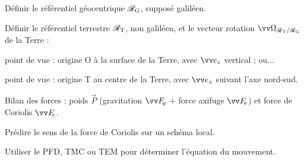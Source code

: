 \documentclass[12pt,fancy]{cours}
\begin{document}
\begin{methode}
  \item	Définir le référentiel géocentrique $\mathcal{R}_{\rm{G}}$, supposé galiléen.
  \item	Définir le référentiel terrestre $\mathcal{R}_{\rm T}$, non galiléen, et le vecteur rotation $\Vec{\Omega}_{\rm \RT/\RG}$ de la Terre :
  \begin{liste}
    \item point de vue  : origine O à la surface de la Terre, avec  $\ez$ vertical ; ou...
    \item point de vue  : origine T au centre de la Terre, avec $\ez$ suivant l'axe nord-sud.
  \end{liste}
  \item Bilan des forces : poids $\Vec{P}$ (gravitation $\F_{\!g}$ $+$ force axifuge $\Fe$) et force de Coriolis $\Fc$.
  \item Prédire le sens de la force de Coriolis sur un schéma local.
  \item Utiliser le PFD, TMC ou TEM pour déterminer l'équation du mouvement.
\end{methode}


\end{document}
